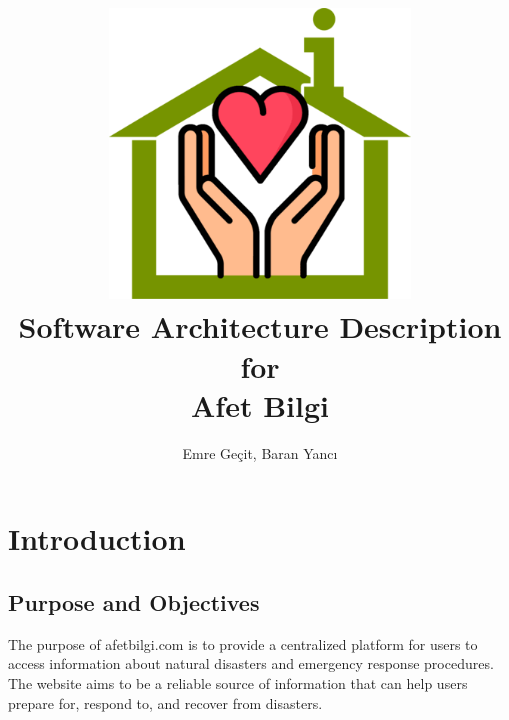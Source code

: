 \documentclass[a4paper]{article}
\author{Emre Geçit, Baran Yancı}
\begin{document}
    \title{\includegraphics[width=0.6\textwidth]{assets/favicon.png}\\ Software Architecture Description for \\  \textbf{Afet Bilgi}}
    \maketitle

    \newpage
    \makeatletter
	\renewcommand\tableofcontents{%
		\null\hfill\textbf{\Large\contentsname}\hfill\null\par
		\@mkboth{\MakeUppercase\contentsname}{\MakeUppercase\contentsname}%
	}
	\makeatother

    \tableofcontents
    \listoffigures
    \listoftables
    \doublespacing

    \newpage

    \section{Introduction}
    \subsection{Purpose and Objectives}
    The purpose of afetbilgi.com is to provide a centralized platform for users to access information about natural disasters and
    emergency response procedures. The website aims to be a reliable source of information that can help users prepare for,
    respond to, and recover from disasters.
\end{document}
